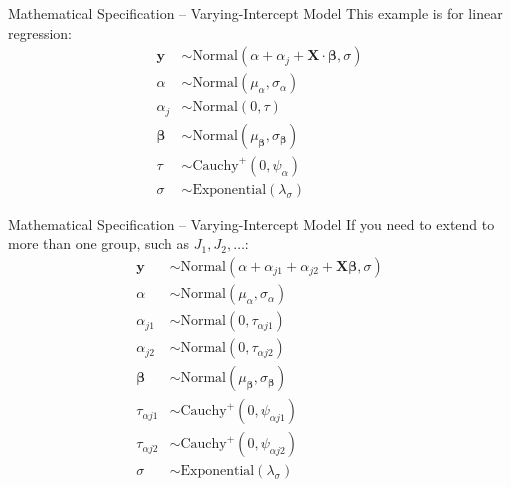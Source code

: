 \begin{frame}{Mathematical Specification -- Varying-Intercept Model}
	This example is for linear regression:
	$$
		\begin{aligned}
			\mathbf{y}         & \sim \text{Normal}\left( \alpha + \alpha_j + \mathbf{X} \cdot \boldsymbol{\beta}, \sigma \right) \\
			\alpha             & \sim \text{Normal}(\mu_\alpha, \sigma_\alpha)                                                    \\
			\alpha_j           & \sim \text{Normal}(0, \tau)                                                                      \\
			\boldsymbol{\beta} & \sim \text{Normal}(\mu_{\boldsymbol{\beta}}, \sigma_{\boldsymbol{\beta}})                        \\
			\tau               & \sim \text{Cauchy}^+(0, \psi_{\alpha})                                                           \\
			\sigma             & \sim \text{Exponential}(\lambda_\sigma)
		\end{aligned}
	$$
\end{frame}

\begin{frame}{Mathematical Specification -- Varying-Intercept Model}
	If you need to extend to more than one group,
	such as $J_1, J_2, \dots$:
	$$
		\begin{aligned}
			\mathbf{y}         & \sim \text{Normal}(\alpha + \alpha_{j1} + \alpha_{j2} + \mathbf{X} \boldsymbol{\beta}, \sigma) \\
			\alpha             & \sim \text{Normal}(\mu_\alpha, \sigma_\alpha)                                                  \\
			\alpha_{j1}        & \sim \text{Normal}(0, \tau_{\alpha j1})                                                        \\
			\alpha_{j2}        & \sim \text{Normal}(0, \tau_{\alpha j2})                                                        \\
			\boldsymbol{\beta} & \sim \text{Normal}(\mu_{\boldsymbol{\beta}}, \sigma_{\boldsymbol{\beta}})                      \\
			\tau_{\alpha j1}   & \sim \text{Cauchy}^+(0, \psi_{\alpha j1})                                                      \\
			\tau_{\alpha j2}   & \sim \text{Cauchy}^+(0, \psi_{\alpha j2})                                                      \\
			\sigma             & \sim \text{Exponential}(\lambda_\sigma)
		\end{aligned}
	$$
\end{frame}

